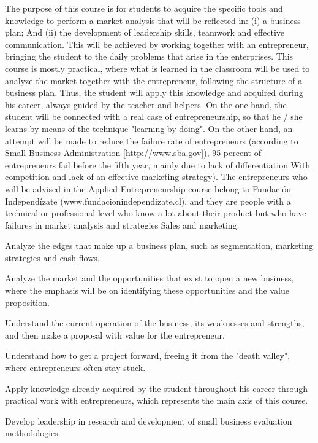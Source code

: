 \begin{syllabus}


\begin{justification}
The purpose of this course is for students to acquire the specific tools and knowledge to perform a market analysis that will be reflected in: (i) a business plan; And (ii) the development of leadership skills, teamwork and effective communication.
This will be achieved by working together with an entrepreneur, bringing the student to the daily problems that arise in the enterprises.
This course is mostly practical, where what is learned in the classroom will be used to analyze the market together with the entrepreneur, following the structure of a business plan. Thus, the student will apply this knowledge and acquired during his career, always guided by the teacher and helpers.
On the one hand, the student will be connected with a real case of entrepreneurship, so that he / she learns by means of the technique "learning by doing". On the other hand, an attempt will be made to reduce the failure rate of entrepreneurs (according to Small Business Administration [http://www.sba.gov]), 95 percent of entrepreneurs fail before the fifth year, mainly due to lack of differentiation With competition and lack of an effective marketing strategy).
The entrepreneurs who will be advised in the Applied Entrepreneurship course belong to Fundación Independízate (www.fundacionindependizate.cl), and they are people with a technical or professional level who know a lot about their product but who have failures in market analysis and strategies Sales and marketing.

\end{justification}

\begin{goals}
\item Analyze the edges that make up a business plan, such as segmentation, marketing strategies and cash flows.
\item Analyze the market and the opportunities that exist to open a new business, where the emphasis will be on identifying these opportunities and the value proposition.
\item Understand the current operation of the business, its weaknesses and strengths, and then make a proposal with value for the entrepreneur.
\item Understand how to get a project forward, freeing it from the "death valley", where entrepreneurs often stay stuck.
\item Apply knowledge already acquired by the student throughout his career through practical work with entrepreneurs, which represents the main axis of this course.
\item Develop leadership in research and development of small business evaluation methodologies.
\end{goals}


\end{syllabus}

